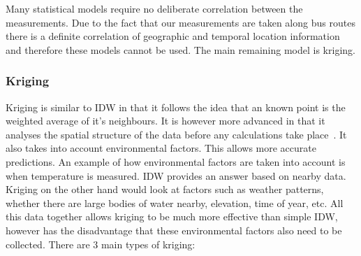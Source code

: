 Many statistical models require no deliberate correlation between the measurements. Due to the fact that our measurements are taken along bus routes there is a definite correlation of geographic and temporal location information and therefore these models cannot be used. The main remaining model is kriging.

\subsubsection{Kriging}

Kriging is similar to IDW in that it follows the idea that an known point is the weighted average of it's neighbours. It is however more advanced in that it analyses the spatial structure of the data before any calculations take place~\cite{geostatisticalradiomapping}. It also takes into account environmental factors. This allows more accurate predictions. An example of how environmental factors are taken into account is when temperature is measured. IDW provides an answer based on nearby data. Kriging on the other hand would look at factors such as weather patterns, whether there are large bodies of water nearby, elevation, time of year, etc. All this data together allows kriging to be much more effective than simple IDW, however has the disadvantage that these environmental factors also need to be collected. There are 3 main types of kriging:

